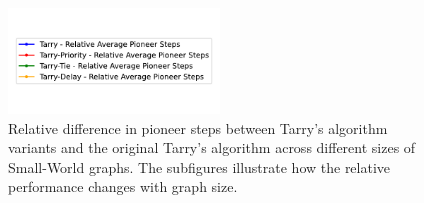 \begin{figure}[H]
    \centering
    \qquad
    \qquad
    \includegraphics[width=0.5\textwidth]{Cap3/tarry_var_steps_legend_relative.pdf}
    \newline
    \qquad 
    \newline
    \qquad
    \caption{Relative difference in pioneer steps between Tarry's algorithm variants and the original Tarry's algorithm across different sizes of Small-World graphs. The subfigures illustrate how the relative performance changes with graph size.} 
    \label{fig_tarry_steps_relative_all_sizes_sw}
\end{figure}

